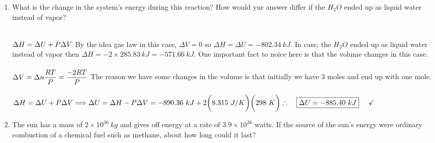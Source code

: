 \documentclass[fleqn]{article}
\begin{document}
\begin{enumerate}
\begin{enumerate}
      \item What is the change in the system's energy during this reaction? How would yur answer differ if 
      the $H_2 O$ ended up as liquid water instead of vapor?

          \textcolor{hwColor}{
            \\
            $
              \Delta H=\Delta U+P \Delta V
              \\
              \\
            $
            By the idea gas law in this case, $\Delta V=0$ so $\Delta H=\Delta U=-802.34 ~ kJ$. In case, 
            the $H_2O$ ended up as liquid water instead of vapor then $\Delta H=-2 \times 285.83 ~ kJ=-571.66 ~ kJ$.
            One important fact to noice here is that the volume changes in this case. 
            \\
            \\
            $
              \Delta V=\Delta n \dfrac{RT}{P}=\dfrac{-2RT}{P}
              \\
              \\
            $
            The reason we have some changes in the volume is that initially we have 3 moles and end up with one mole.
            \\
            \\
            $
              \Delta H=\Delta U+P \Delta V 
              \Longrightarrow \Delta U=\Delta H-P\Delta V=-890.36 ~ kJ+2 \bigg( 8.315 ~ J/K\bigg) \bigg( 298 ~ K\bigg)
              \\
              \\
              \therefore ~~~ \boxed{
                \Delta U=-885.40 ~ kJ
              } ~~~~ \checkmark
              \\
              \\
            $ 
          }

      \item The sun has a mass of $2 \times 10^{30} ~ kg$ and gives off energy at a rate of $3.9 \times 10^{26}$
      watts. If the source of the sun's energy were ordinary combustion of a chemical fuel such as methane, about 
      how long could it last?


\end{enumerate}
\end{enumerate}
\end{document}
